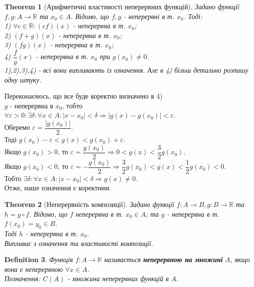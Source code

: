 \documentclass[a4paper, 14pt]{article}
\theoremstyle{theoremdd}
\newtheorem{theorem}{Theorem}[subsection]
\theoremstyle{theoremdd}
\newtheorem{definition}[theorem]{Definition}
\theoremstyle{theoremdd}
\theoremstyle{theoremdd}
\theoremstyle{theoremdd}
\theoremstyle{theoremdd}
\theoremstyle{theoremdd}
\theoremstyle{theoremdd}
\begin{document}
\begin{theorem}[Арифметичні властивості неперервних функцій]
Задано функції $f,g: A \to \mathbb{R}$ та $x_0 \in A$. Відомо, що $f,g$ - неперервні в т. $x_0$. Тоді:\\
1) $\forall c \in \mathbb{R}: (cf)(x)$ - неперервна в т. $x_0$;\\
2) $(f+g)(x)$ - неперервна в т. $x_0$;\\
3) $(fg)(x)$ - неперервна в т. $x_0$;\\
4) $\dfrac{f}{g}(x)$ - неперервна в т. $x_0$ при $g(x_0) \neq 0$.\\
\textit{1),2),3),4) - всі вони випливають із означення. Але в 4) більш детально розпишу одну штуку.}
\end{theorem}
Переконаємось, що все буде коректно визначено в 4)\\
$g$ - неперервна в $x_0$, тобто $\forall \varepsilon > 0: \exists \delta: \forall x \in A: |x-x_0|<\delta \Rightarrow |g(x)-g(x_0)|<\varepsilon$.\\
Оберемо $\varepsilon = \dfrac{|g(x_0)|}{2}$.\\
Тоді $g(x_0)-\varepsilon <g(x) <g(x_0)+\varepsilon$.\\
Якщо $g(x_0) > 0$, то $\varepsilon = \dfrac{g(x_0)}{2} \Rightarrow 0 < g(x) < \dfrac{3}{2}g(x_0)$.\\
Якщо $g(x_0) < 0$, то $\varepsilon = -\dfrac{g(x_0)}{2} \Rightarrow \dfrac{3}{2}g(x_0) < g(x) < \dfrac{1}{2}g(x_0) < 0$.\\
Тобто $\exists \delta: \forall x \in A: |x-x_0|<\delta \Rightarrow g(x) \neq 0$.\\
Отже, наше означення є коректним.

\begin{theorem}[Неперервність композиції]
Задано функції $f: A \to B, g: B \to \mathbb{R}$ та $h = g \circ f$. Відомо, що $f$ неперервна в т. $x_0 \in A$; та $g$ - неперервна в т. $f(x_0) = y_0 \in B$.\\
Тоді $h$ - неперервна в т. $x_0$.\\
\textit{Випливає з означення та властивості композиції.}
\end{theorem}

\begin{definition}
Функція $f: A \to \mathbb{R}$ називається \textbf{неперервною на множині} $A$, якщо вона є неперервною $\forall x \in A$.\\
Позначення: $C(A)$ - множина неперервних функцій в $A$.\\
\end{definition}
\end{document}
